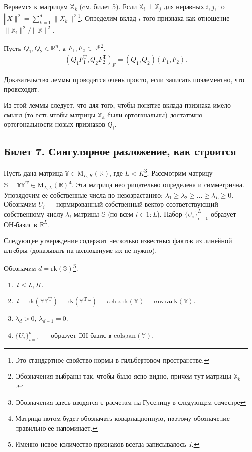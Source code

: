 Вернемся к матрицам $\mathbb X_k$ (cм. билет 5). Если $\mathbb X_i \perp \mathbb X_j$ для неравных $i, j$, то $\mathbb \|X\|^2 = \sum_{k=1}^d \|X_k\|^2$\footnote{Это
стандартное свойство нормы в гильбертовом пространстве.}.
Определим вклад $i$-того признака как отношение $\| \mathbb X_i \|^2 / \| \mathbb X \|^2$.

\begin{lem}
    Пусть $Q_1, Q_2 \in \mathbb R^n$, а $F_1, F_2 \in \mathbb R^p$\footnote{Обозначения выбраны так, чтобы было ясно видно, причем тут матрицы $\mathbb X_k$.}.
    \begin{gather*}
        \left(Q_1 F_1^\mathrm T, Q_2 F_2^\mathrm T\right)_F = (Q_1, Q_2) (F_1, F_2).
    \end{gather*}
\end{lem}
Доказательство леммы проводится очень просто, если записать поэлементно, что происходит.

Из этой леммы следует, что для того, чтобы понятие вклада признака имело смысл (то есть чтобы матрицы $\mathbb X_k$ были ортогональны) достаточно ортогональности новых признаков $Q_i$.

\subsection{Билет 7. Сингулярное разложение, как строится}

Пусть дана матрица $\mathbb Y \in \mathrm M_{L, K}(\mathbb R)$, где $L < K$\footnote{Обозначения здесь вводятся с расчетом на Гусеницу в следующем семестре}.
Рассмотрим матрицу $\mathbb S = \mathbb Y\mathbb Y^\mathrm T \in \mathrm M_{L,L}(\mathbb R)$\footnote{Матрица потом будет обозначать ковариационную, поэтому обозначение правильно ее напоминает.}.
Эта матрица неотрицательно определена и симметрична. Упорядочим ее собственные числа по невозрастанию: $\lambda_1 \geqslant \lambda_2 \geqslant \ldots \geqslant \lambda_L \geqslant 0$.
Обозначим $U_i$ --- нормированный собственный вектор соответствующий собственному числу $\lambda_i$ матрицы $\mathbb S$ (по всем $i \in 1:L$).
Набор $\{U_i\}_{i=1}^L$ образует ОН-базис в $\mathbb R^L$.

Следующее утверждение содержит несколько известных фактов из линейной алгебры (доказывать на коллоквиуме их не нужно).
\begin{thm}
    Обозначим $d = \mathrm {rk}(\mathbb S)$\footnote{Именно новое количество признаков всегда записывалось $d$.}.
    \begin{enumerate}
        \item $d \leqslant{L, K}$.
        \item $d = \mathrm{rk}(\mathbb Y \mathbb Y^\mathrm T) = \mathrm{rk}(\mathbb Y^\mathrm T \mathbb Y) = \mathrm{colrank}(\mathbb Y) = \mathrm{rowrank}(\mathbb Y).$
        \item $\lambda_d > 0$, $\lambda_{d + 1} = 0$.
        \item $\{U_i\}_{i=1}^d$ --- образует ОН-базис в $\mathrm{colspan}(\mathbb Y)$.
    \end{enumerate}
\end{thm}

